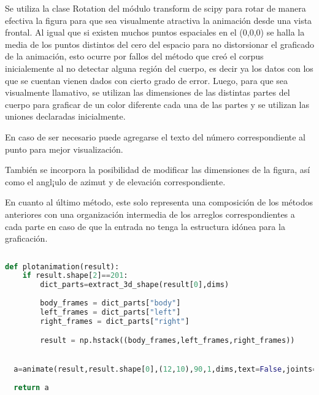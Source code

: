Se utiliza la clase Rotation del módulo transform de scipy para rotar de manera efectiva la figura para que sea visualmente atractiva la animación desde una vista frontal. Al igual que si existen muchos puntos espaciales en el (0,0,0) se halla la media de los puntos distintos del cero del espacio para no distorsionar el graficado de la animación, esto ocurre por fallos del método que creó el corpus inicialemente al no detectar alguna región del cuerpo, es decir ya los datos con los que se cuentan vienen dados con cierto grado de error.
Luego, para que sea visualmente llamativo, se utilizan las dimensiones de las distintas partes del cuerpo para graficar de un color diferente cada una de las partes y se utilizan las uniones declaradas inicialmente. 

En caso de ser necesario puede agregarse el texto del número correspondiente al punto para mejor visualización.

También se incorpora la posibilidad de modificar las dimensiones de la figura, así como el angl¡ulo de azimut y de elevación correspondiente.


En cuanto al último método, este solo representa una composición de los métodos anteriores con una organización intermedia de los arreglos correspondientes a cada parte en caso de que la entrada no tenga la estructura idónea para la graficación.

\begin{lstlisting}[language=Python, caption={Graficar la animación }]
  
def plotanimation(result):
	if result.shape[2]==201:
  		dict_parts=extract_3d_shape(result[0],dims)
      
  		body_frames = dict_parts["body"]
  		left_frames = dict_parts["left"]
  		right_frames = dict_parts["right"]

  		result = np.hstack((body_frames,left_frames,right_frames))
  		

  a=animate(result,result.shape[0],(12,10),90,1,dims,text=False,joints=True)
  
  return a
\end{lstlisting}

